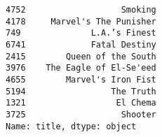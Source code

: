 \documentclass[11pt]{article}
\makeatletter
\newcommand{\boxspacing}{\kern\kvtcb@left@rule\kern\kvtcb@boxsep}
\newcommand{\prompt}[4]{
        {\ttfamily\llap{{\color{#2}[#3]:\hspace{3pt}#4}}\vspace{-\baselineskip}}
    }
\makeatother
\begin{document}
            \begin{tcolorbox}[breakable, size=fbox, boxrule=.5pt, pad at break*=1mm, opacityfill=0]
\prompt{Out}{outcolor}{74}{\boxspacing}
\begin{Verbatim}[commandchars=\\\{\}]
4752                   Smoking
4178     Marvel's The Punisher
749              L.A.’s Finest
6741             Fatal Destiny
2415        Queen of the South
3976    The Eagle of El-Se'eed
4655        Marvel's Iron Fist
5194                 The Truth
1321                  El Chema
3725                   Shooter
Name: title, dtype: object
\end{Verbatim}
\end{tcolorbox}
        

    
    
    
\end{document}
